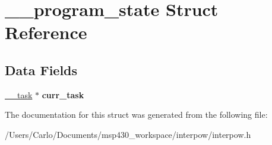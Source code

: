 \hypertarget{struct____program__state}{}\section{\+\_\+\+\_\+program\+\_\+state Struct Reference}
\label{struct____program__state}
\subsection*{Data Fields}
\begin{DoxyCompactItemize}
\item 
\mbox{\label{struct____program__state_acf1ab2c14dfddd383871e468479525ac}} 
\hyperlink{struct____task}{\+\_\+\+\_\+task} $\ast$ {\bfseries curr\+\_\+task}
\end{DoxyCompactItemize}


The documentation for this struct was generated from the following file\+:\begin{DoxyCompactItemize}
\item 
/\+Users/\+Carlo/\+Documents/msp430\+\_\+workspace/interpow/interpow.\+h\end{DoxyCompactItemize}

